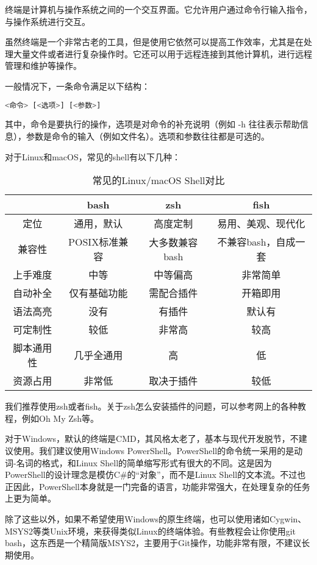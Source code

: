 \documentclass[../main.tex]{subfiles}
\begin{document}
终端是计算机与操作系统之间的一个交互界面。它允许用户通过命令行输入指令，与操作系统进行交互。

虽然终端是一个非常古老的工具，但是使用它依然可以提高工作效率，尤其是在处理大量文件或者进行复杂操作时。它还可以用于远程连接到其他计算机，进行远程管理和维护等操作。

一般情况下，一条命令满足以下结构：
\begin{lstlisting}[language=bash]
    <命令> [<选项>] [<参数>]
\end{lstlisting}

其中，命令是要执行的操作，选项是对命令的补充说明（例如 -h 往往表示帮助信息），参数是命令的输入（例如文件名）。选项和参数往往都是可选的。

对于Linux和macOS，常见的shell有以下几种：

\begin{table}[ht]
  \centering
  \begin{tabular}{c|ccc}
    \toprule
    & \textbf{bash} & \textbf{zsh} & \textbf{fish} \\
    \midrule
    定位 & 通用，默认 & 高度定制 & 易用、美观、现代化 \\
    兼容性 & POSIX标准兼容 & 大多数兼容bash & 不兼容bash，自成一套 \\
    上手难度 & 中等 & 中等偏高 & 非常简单 \\
    自动补全 & 仅有基础功能 & 需配合插件 & 开箱即用 \\
    语法高亮 & 没有 & 有插件 & 默认有 \\
    可定制性 & 较低 & 非常高 & 较高 \\
    脚本通用性 & 几乎全通用 & 高 & 低 \\
    资源占用 & 非常低 & 取决于插件 & 较低 \\
    \bottomrule
  \end{tabular}
  \caption{常见的Linux/macOS Shell对比}
\end{table}
我们推荐使用zsh或者fish。关于zsh怎么安装插件的问题，可以参考网上的各种教程，例如Oh My Zsh等。

对于Windows，默认的终端是CMD，其风格太老了，基本与现代开发脱节，不建议使用。我们建议使用Windows PowerShell。PowerShell的命令统一采用的是动词-名词的格式，和Linux Shell的简单缩写形式有很大的不同。这是因为PowerShell的设计理念是模仿C\#的“对象”，而不是Linux Shell的文本流。不过也正因此，PowerShell本身就是一门完备的语言，功能非常强大，在处理复杂的任务上更为简单。

除了这些以外，如果不希望使用Windows的原生终端，也可以使用诸如Cygwin、MSYS2等类Unix环境，来获得类似Linux的终端体验。有些教程会让你使用git bash，这东西是一个精简版MSYS2，主要用于Git操作，功能非常有限，不建议长期使用。
\end{document}
